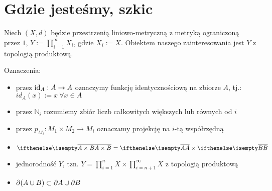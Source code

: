 \section{Gdzie jesteśmy, szkic}
Niech $(X, d)$ będzie przestrzenią liniowo-metryczną z metryką ograniczoną przez $1$, $Y := \prod_{i=1}^{\infty} X_i$, gdzie $X_i := X$. Obiektem naszego zainteresowania jest $Y$ z topologią produktową.

Oznaczenia:
\begin{itemize}
  \item przez $\operatorname{id}_A: A \rightarrow A$ oznaczymy funkcję identycznościową na zbiorze $A$, tj.: $id_A(x) := x\ \forall x \in A$
  \item przez $\mathbb{N}_i$  rozumiemy zbiór liczb całkowitych większych lub równych od $i$
  \item przez $p_{M_i}: M_1 \times M_2 \rightarrow M_i$ oznaczamy projekcję na $i$-tą współrzędną
\end{itemize}

\begin{note} \mbox{} %
\begin{itemize}
  \item $\cl{A \times B} = \cl A \times \cl B$
  \item jednorodność $Y$, tzn. $Y = \prod_{i=1}^n X \times \prod_{i=n+1}^\infty X$ z topologią produktową
  \item $\partial(A \cup B) \subset \partial A \cup \partial B$
\end{itemize}
\end{note}